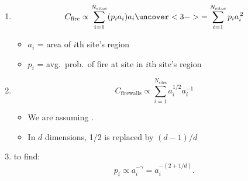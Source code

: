 



\begin{frame}
  \small
  \begin{block}{}
    \begin{enumerate}
    \item<+->
      $$
      C_{\textrm{fire}}
      \propto \sum_{i=1}^{N_{\textrm{sites}}} (p_i a_i) a_i
      \uncover<3->{= \sum_{i=1}^{N_{\textrm{sites}}} p_i a_i^{\, 2}}
      $$ 
      \begin{itemize}
      \item<2-> 
        $a_i$ = area of $i$th site's region
      \item<2->
        $p_i$ = avg.\ prob.\ of fire at site in $i$th site's region
      \end{itemize}
    \item<4->
      $$
      C_{\textrm{firewalls}} \propto \sum_{i=1}^{N_{\textrm{sites}}} a_i^{1/2} a_i^{-1}
      $$
      \begin{itemize}
      \item<5->
        We are assuming .
      \item<6->
        In $d$ dimensions, 1/2 is replaced by $(d-1)/d$
      \end{itemize}
    \item<7->
       to find:\\
      $$ 
      \boxed{
        p_i \propto a_i^{-\gamma} 
        = a_i^{-(2 + 1/d)}.
      }
      $$
    \end{enumerate}
  \end{block}

\end{frame}

